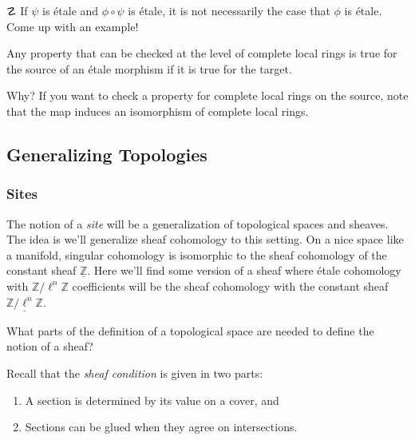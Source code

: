 \begin{exercise}[?]

\(\danger\) If \(\psi\) is étale and \(\phi\circ\psi\) is étale, it is
not necessarily the case that \(\phi\) is étale. Come up with an
example!

\end{exercise}

\begin{corollary}

Any property that can be checked at the level of complete local rings is
true for the source of an étale morphism if it is true for the target.

\end{corollary}

Why? If you want to check a property for complete local rings on the
source, note that the map induces an isomorphism of complete local
rings.

\hypertarget{generalizing-topologies}{%
\subsection{Generalizing Topologies}\label{generalizing-topologies}}

\hypertarget{sites}{%
\subsubsection{Sites}\label{sites}}

The notion of a \emph{site} will be a generalization of topological
spaces and sheaves. The idea is we'll generalize sheaf cohomology to
this setting. On a nice space like a manifold, singular cohomology is
isomorphic to the sheaf cohomology of the constant sheaf
\(\underline{{\mathbb{Z}}}\). Here we'll find some version of a sheaf
where étale cohomology with \({\mathbb{Z}}/\ell^n{\mathbb{Z}}\)
coefficients will be the sheaf cohomology with the constant sheaf
\(\underline{{\mathbb{Z}}/\ell^n{\mathbb{Z}}}\).

\begin{question}

What parts of the definition of a topological space are needed to define
the notion of a sheaf?

\end{question}

\begin{remark}

Recall that the \emph{sheaf condition} is given in two parts:

\begin{enumerate}
\def\labelenumi{\arabic{enumi}.}
\item
  A section is determined by its value on a cover, and
\item
  Sections can be glued when they agree on intersections.
\end{enumerate}

\end{remark}

